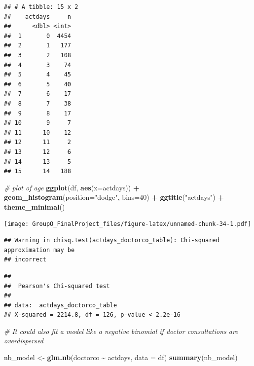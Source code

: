 \documentclass[
]{article}
\newenvironment{Shaded}{\begin{snugshade}}{\end{snugshade}}
\newcommand{\AttributeTok}[1]{\textcolor[rgb]{0.13,0.29,0.53}{#1}}
\newcommand{\CommentTok}[1]{\textcolor[rgb]{0.56,0.35,0.01}{\textit{#1}}}
\newcommand{\DecValTok}[1]{\textcolor[rgb]{0.00,0.00,0.81}{#1}}
\newcommand{\FunctionTok}[1]{\textcolor[rgb]{0.13,0.29,0.53}{\textbf{#1}}}
\newcommand{\NormalTok}[1]{#1}
\newcommand{\OtherTok}[1]{\textcolor[rgb]{0.56,0.35,0.01}{#1}}
\newcommand{\SpecialCharTok}[1]{\textcolor[rgb]{0.81,0.36,0.00}{\textbf{#1}}}
\newcommand{\StringTok}[1]{\textcolor[rgb]{0.31,0.60,0.02}{#1}}
\begin{document}
\begin{verbatim}
## # A tibble: 15 x 2
##    actdays     n
##      <dbl> <int>
##  1       0  4454
##  2       1   177
##  3       2   108
##  4       3    74
##  5       4    45
##  6       5    40
##  7       6    17
##  8       7    38
##  9       8    17
## 10       9     7
## 11      10    12
## 12      11     2
## 13      12     6
## 14      13     5
## 15      14   188
\end{verbatim}

\begin{Shaded}
\begin{Highlighting}[]
\CommentTok{\# plot of age}
\FunctionTok{ggplot}\NormalTok{(df, }\FunctionTok{aes}\NormalTok{(}\AttributeTok{x=}\NormalTok{actdays)) }\SpecialCharTok{+}
  \FunctionTok{geom\_histogram}\NormalTok{(}\AttributeTok{position=}\StringTok{"dodge"}\NormalTok{, }\AttributeTok{bins=}\DecValTok{40}\NormalTok{) }\SpecialCharTok{+}
  \FunctionTok{ggtitle}\NormalTok{(}\StringTok{"actdays"}\NormalTok{) }\SpecialCharTok{+}
  \FunctionTok{theme\_minimal}\NormalTok{()}
\end{Highlighting}
\end{Shaded}

\texttt{[image: GroupO\_FinalProject\_files/figure-latex/unnamed-chunk-34-1.pdf]}

\begin{Shaded}
\end{Shaded}

\begin{verbatim}
## Warning in chisq.test(actdays_doctorco_table): Chi-squared approximation may be
## incorrect
\end{verbatim}

\begin{verbatim}
## 
##  Pearson's Chi-squared test
## 
## data:  actdays_doctorco_table
## X-squared = 2214.8, df = 126, p-value < 2.2e-16
\end{verbatim}

\begin{Shaded}
\begin{Highlighting}[]
\CommentTok{\# It could also fit a model like a negative binomial if doctor consultations are overdispersed}

\NormalTok{nb\_model }\OtherTok{\textless{}{-}} \FunctionTok{glm.nb}\NormalTok{(doctorco }\SpecialCharTok{\textasciitilde{}}\NormalTok{ actdays, }\AttributeTok{data =}\NormalTok{ df)}
\FunctionTok{summary}\NormalTok{(nb\_model)}
\end{Highlighting}
\end{Shaded}
\end{document}
